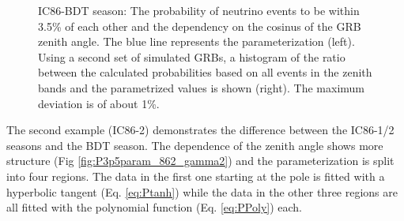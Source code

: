 \begin{figure}[h]
\centering
 \captionsetup{width=.9\textwidth}
\caption{IC86-BDT season: The probability of neutrino events to be within 3.5\% 
of each other and the dependency on the cosinus of the GRB zenith angle. The 
blue line represents the parameterization (left). Using a second set of 
simulated GRBs, a histogram 
of the ratio between the calculated probabilities based on all events in 
the zenith bands and the parametrized values is shown (right). The maximum 
deviation 
is of about 1\%.}
\end{figure}

The second example (IC86-2) demonstrates the difference between the IC86-1/2 
seasons 
and the BDT season. The dependence of the zenith angle shows more structure 
(Fig \ref{fig:P3p5param_862_gamma2}) and the parameterization is split into 
four regions. The data in the first one starting at the pole is fitted with a
hyperbolic tangent (Eq. \ref{eq:Ptanh}) while the data in the other three 
regions are all fitted with the polynomial function (Eq. \ref{eq:PPoly}) each.

